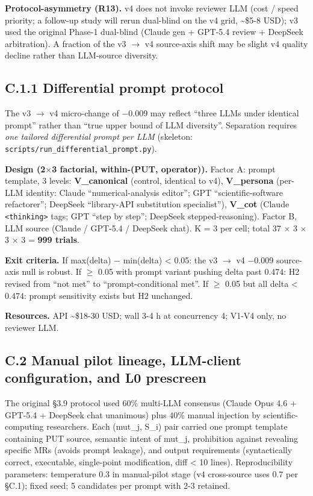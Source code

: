 \documentclass[acmsmall,screen,review]{acmart}
\begin{document}
\textbf{Protocol-asymmetry (R13).} v4 does not invoke reviewer LLM (cost
/ speed priority; a follow-up study will rerun dual-blind on the v4
grid, \textasciitilde\$5-8 USD); v3 used the original Phase-1 dual-blind
(Claude gen + GPT-5.4 review + DeepSeek arbitration). A fraction of the
v3 $\to$ v4 source-axis shift may be slight v4 quality decline rather than
LLM-source diversity.

\subsection{C.1.1 Differential prompt protocol}\label{c.1.1-differential-prompt-protocol-future-work-commitment}

The v3 $\to$ v4 micro-change of −0.009 may reflect ``three LLMs under
identical prompt'' rather than ``true upper bound of LLM diversity''.
Separation requires \emph{one tailored differential prompt per LLM}
(skeleton: \texttt{scripts/run\_differential\_prompt.py}).

\textbf{Design (2$\times$3 factorial, within-(PUT, operator)).} Factor A:
prompt template, 3 levels: \textbf{V\_canonical} (control, identical to
v4), \textbf{V\_persona} (per-LLM identity: Claude ``numerical-analysis
editor''; GPT ``scientific-software refactorer''; DeepSeek ``library-API
substitution specialist''), \textbf{V\_cot} (Claude
\texttt{\textless{}thinking\textgreater{}} tags; GPT ``step by step'';
DeepSeek stepped-reasoning). Factor B, LLM source (Claude / GPT-5.4 /
DeepSeek chat). K = 3 per cell; total 37 $\times$ 3 $\times$ 3 $\times$ 3 = \textbf{999
trials}.

\textbf{Exit criteria.} If max(delta) − min(delta) \textless{} 0.05: the
v3 $\to$ v4 −0.009 source-axis null is robust. If $\geq$ 0.05 with prompt variant
pushing delta past 0.474: H2 revised from ``not met'' to
``prompt-conditional met''. If $\geq$ 0.05 but all delta \textless{} 0.474:
prompt sensitivity exists but H2 unchanged.

\textbf{Resources.} API \textasciitilde\$18-30 USD; wall 3-4 h at
concurrency 4; V1-V4 only, no reviewer LLM.

\subsection{C.2 Manual pilot lineage, LLM-client configuration, and L0 prescreen}\label{c.2-manual-pilot-lineage-llm-client-configuration-and-l0-prescreen}

The original §3.9 protocol used 60\% multi-LLM consensus (Claude Opus
4.6 + GPT-5.4 + DeepSeek chat unanimous) plus 40\% manual injection by
scientific-computing researchers. Each (mut\_j, S\_i) pair carried one
prompt template containing PUT source, semantic intent of mut\_j,
prohibition against revealing specific MRs (avoids prompt leakage), and
output requirements (syntactically correct, executable, single-point
modification, diff \textless{} 10 lines). Reproducibility parameters:
temperature 0.3 in manual-pilot stage (v4 cross-source uses 0.7 per
§C.1); fixed seed; 5 candidates per prompt with 2-3 retained.
\end{document}
